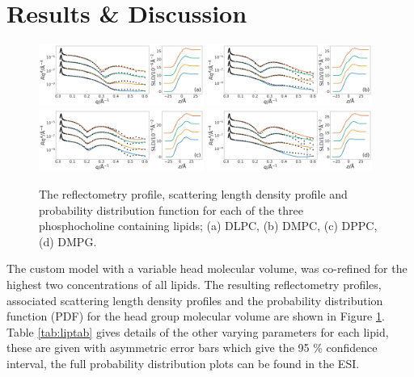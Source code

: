 \documentclass[twoside,twocolumn,9pt]{article}
\begin{document}
\section{Results \& Discussion}

\begin{figure}
	\centering
	\includegraphics[width=0.48\textwidth]{figures/DLPC_all_data}
	\includegraphics[width=0.48\textwidth]{figures/DMPC_all_data}
	\includegraphics[width=0.48\textwidth]{figures/DPPC_all_data}
	\includegraphics[width=0.48\textwidth]{figures/DMPG_all_data}
	\caption{The reflectometry profile, scattering length density profile and probability distribution function for each of the three phosphocholine containing lipids; (a) DLPC, (b) DMPC, (c) DPPC, (d) DMPG.}
	\label{fig:lipids}
\end{figure}
The custom model with a variable head molecular volume, was co-refined for the highest two concentrations of all lipids. The resulting reflectometry profiles, associated scattering length density profiles and the probability distribution function (PDF) for the head group molecular volume are shown in Figure \ref{fig:lipids}. Table \ref{tab:liptab} gives details of the other varying parameters for each lipid, these are given with asymmetric error bars which give the 95 \% confidence interval, the full probability distribution plots can be found in the ESI. 
\end{document}
